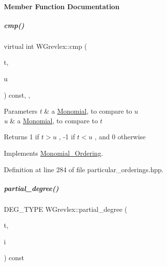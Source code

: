 \paragraph{Member Function Documentation}
\mbox{\label{group__orderinggroup_a0a65b26c9057d7f9d8c29ca3896cfd74}} 
\subparagraph{\texorpdfstring{cmp()}{cmp()}}
{\footnotesize\ttfamily virtual int W\+Grevlex\+::cmp (\begin{DoxyParamCaption}\item[{const \hyperlink{group__polygroup_class_monomial}{Monomial} \&}]{t,  }\item[{const \hyperlink{group__polygroup_class_monomial}{Monomial} \&}]{u }\end{DoxyParamCaption}) const\hspace{0.3cm}{\ttfamily [inline]}, {\ttfamily [override]}, {\ttfamily [virtual]}}


\begin{DoxyParams}{Parameters}
{\em t} & a \hyperlink{group__polygroup_class_monomial}{Monomial}, to compare to $ u $ \\
\hline
{\em u} & a \hyperlink{group__polygroup_class_monomial}{Monomial}, to compare to $ t $ \\
\hline
\end{DoxyParams}
\begin{DoxyReturn}{Returns}
1 if $ t > u $ , -\/1 if $ t < u $ , and 0 otherwise 
\end{DoxyReturn}


Implements \hyperlink{group__orderinggroup_a9bc3155fc98b4d40c26118fa2114b827}{Monomial\+\_\+\+Ordering}.



Definition at line 284 of file particular\+\_\+orderings.\+hpp.

\mbox{\label{group__orderinggroup_ad7e630709c14774bac365c46b9455bab}} 
\subparagraph{\texorpdfstring{partial\+\_\+degree()}{partial\_degree()}}
{\footnotesize\ttfamily D\+E\+G\+\_\+\+T\+Y\+PE W\+Grevlex\+::partial\+\_\+degree (\begin{DoxyParamCaption}\item[{const \hyperlink{group__polygroup_class_monomial}{Monomial} \&}]{t,  }\item[{N\+V\+A\+R\+\_\+\+T\+Y\+PE}]{i }\end{DoxyParamCaption}) const}

